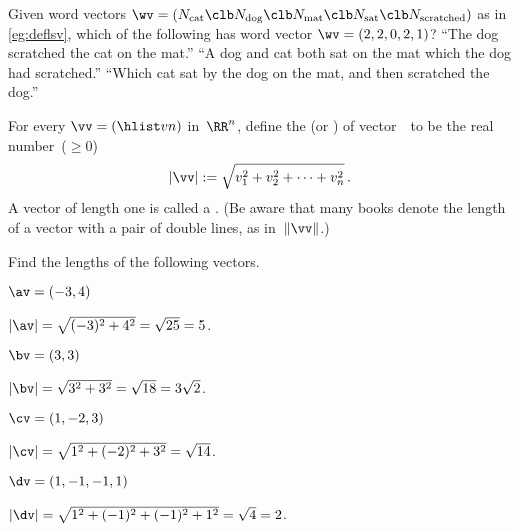 \begin{activity}
Given word vectors \(\wv=(N_{\text{cat}}\clb N_{\text{dog}}\clb N_{\text{mat}}\clb N_{\text{sat}}\clb N_{\text{scratched}})\) as in \autoref{eg:deflsv},
which of the following has word vector \(\wv=(2,2,0,2,1)\)?
{``The dog scratched the cat on the mat.''}
{``A dog and cat both sat on the mat which the dog had scratched.''}
{``Which cat sat by the dog on the mat, and then scratched the dog.''}
\end{activity}







\begin{definition}[Pythagoras] \label{def:veclen}
For every  \(\vv=(\hlist vn)\) in~\(\RR^n\),
define the  (or ) of vector~\vv\  to be the real number~(\(\geq0\))
\begin{equation*}
|\vv|:=\sqrt{v_1^2+v_2^2+\cdots+v_n^2}\,.
\end{equation*}
A vector of length one is called a .
(Be aware that many books denote the length of a vector with a pair of double lines, as in~\(\|\vv\|\).)
\end{definition}


\begin{example} \label{eg:}
Find the lengths of the following vectors.
\begin{parts}
\item \(\av=(-3,4)\)
\begin{solution} 
\(|\av|=\sqrt{(-3)^2+4^2}=\sqrt{25}=5\). 
\end{solution}

\item \(\bv=(3,3)\)
\begin{solution} 
\(|\bv|=\sqrt{3^2+3^2}=\sqrt{18}=3\sqrt2\). 
\end{solution}


\item \(\cv=(1,-2,3)\)
\begin{solution} 
\(|\cv|=\sqrt{1^2+(-2)^2+3^2}=\sqrt{14}\). 
\end{solution}

\item \(\dv=(1,-1,-1,1)\)
\begin{solution} 
\(|\dv|=\sqrt{1^2+(-1)^2+(-1)^2+1^2}=\sqrt4=2\).
\end{solution}
\end{parts}
\end{example}

